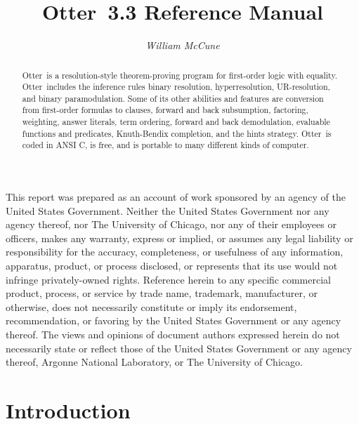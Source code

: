 \documentclass[11pt]{article}
\begin{document}
\noindent
This report was prepared as an account of work sponsored by an agency
of the United States Government.  Neither the United States Government
nor any agency thereof, nor The University of Chicago, nor any of
their employees or officers, makes any warranty, express or implied,
or assumes any legal liability or responsibility for the accuracy,
completeness, or usefulness of any information, apparatus, product, or
process disclosed, or represents that its use would not infringe
privately-owned rights.  Reference herein to any specific commercial
product, process, or service by trade name, trademark, manufacturer,
or otherwise, does not necessarily constitute or imply its
endorsement, recommendation, or favoring by the United States
Government or any agency thereof.  The views and opinions of document
authors expressed herein do not necessarily state or reflect those of
the United States Government or any agency thereof, Argonne National
Laboratory, or The University of Chicago.
\newpage
  \pagestyle{plain}
  \tableofcontents
\newpage


\newcommand{\otter}{{\sc Otter}}
\newcommand{\maxint}{$\infty$}
\newcommand{\unix}{{\sc unix}}

\setcounter{page}{1}
\title{\otter\ 3.3 Reference Manual}

\author{\emph{William McCune}}

\date{}

\maketitle

\begin{abstract}
\otter\ is a resolution-style theorem-proving program for
first-order logic with equality.  \otter\ includes the inference
rules binary resolution, hyperresolution, UR-resolution, and binary
paramodulation.  Some of its other abilities and features are conversion from
first-order formulas to clauses, forward and back subsumption,
factoring, weighting, answer literals, term ordering, forward and back
demodulation, evaluable functions and predicates, Knuth-Bendix
completion, and the hints strategy.
\otter\ is coded in ANSI C, is free, and is portable
to many different kinds of computer.
\end{abstract}

\section{Introduction}
\end{document}
